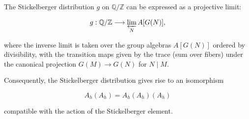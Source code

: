 The Stickelberger distribution $g$ on $\mathbb{Q}/\mathbb{Z}$ can be expressed as a projective limit:

$$
g : \mathbb{Q}/\mathbb{Z} \longrightarrow \varprojlim_{N} A[G(N)],
$$

where the inverse limit is taken over the group algebras $A[G(N)]$ ordered by divisibility, with the transition maps given by the trace (sum over fibers) under the canonical projection $G(M) \to G(N)$ for $N \mid M$.

Consequently, the Stickelberger distribution gives rise to an isomorphism

$$
A_h(A_h) = A_h(A_h)(A_h)
$$

compatible with the action of the Stickelberger element.